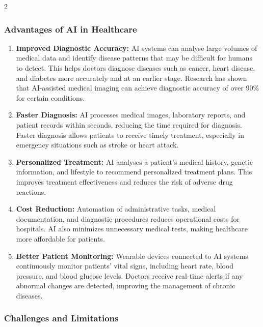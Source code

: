 \begin{multicols}{2}
  \subsubsection*{Advantages of AI in Healthcare}
\begin{enumerate}[label=\alph*)]
  \item \textbf{Improved Diagnostic Accuracy:} AI systems can analyse large volumes of medical data and identify disease patterns that may be difficult for humans to detect. This helps doctors diagnose diseases such as cancer, heart disease, and diabetes more accurately and at an earlier stage. Research has shown that AI-assisted medical imaging can achieve diagnostic accuracy of over 90\% for certain conditions.
  \item \textbf{Faster Diagnosis:} AI processes medical images, laboratory reports, and patient records within seconds, reducing the time required for diagnosis. Faster diagnosis allows patients to receive timely treatment, especially in emergency situations such as stroke or heart attack.
  \item \textbf{Personalized Treatment:} AI analyses a patient's medical history, genetic information, and lifestyle to recommend personalized treatment plans. This improves treatment effectiveness and reduces the risk of adverse drug reactions.
  \item \textbf{Cost Reduction:} Automation of administrative tasks, medical documentation, and diagnostic procedures reduces operational costs for hospitals. AI also minimizes unnecessary medical tests, making healthcare more affordable for patients.
  \item \textbf{Better Patient Monitoring:} Wearable devices connected to AI systems continuously monitor patients' vital signs, including heart rate, blood pressure, and blood glucose levels. Doctors receive real-time alerts if any abnormal changes are detected, improving the management of chronic diseases.
\end{enumerate}

\subsubsection*{Challenges and Limitations}


\end{multicols}
